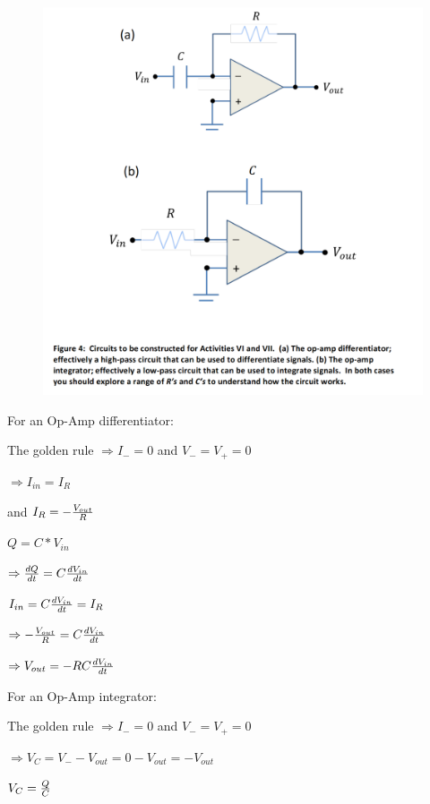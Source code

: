 \documentclass[11pt]{article}
\begin{document}
\begin{figure}[H]
 \begin{center}
  \includegraphics[width=\linewidth/1]{act6and7}
  \caption{}
  \label{fig:act6and7}
 \end{center}
\end{figure}

For an Op-Amp differentiator:

The golden rule $\Rightarrow I_{-}=0$ and $V_{-}=V_{+}=0$

$\Rightarrow I_{in}=I_{R}$

and $I_{R}=-{V_{out}\over R}$

$Q=C*V_{in}$

$\Rightarrow {dQ\over dt}=C{dV_{in}\over dt}$

$I_{in}=C{dV_{in}\over dt}=I_{R}$

$\Rightarrow -{V_{out}\over R}=C{dV_{in}\over dt}$

$\Rightarrow V_{out}=-RC{dV_{in}\over dt}$

\vbox{}

For an Op-Amp integrator:

The golden rule $\Rightarrow I_{-}=0$ and $V_{-}=V_{+}=0$

$\Rightarrow V_{C}=V_{-}-V_{out}=0-V_{out}=-V_{out}$

$V_{C}={Q \over C}$
\end{document}
